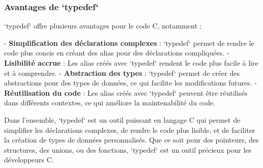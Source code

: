 \subsubsection*{Avantages de `typedef`}

`typedef` offre plusieurs avantages pour le code C, notamment :

- \textbf{Simplification des déclarations complexes} : `typedef` permet de rendre le code plus concis en créant des alias pour des déclarations compliquées.
- \textbf{Lisibilité accrue} : Les alias créés avec `typedef` rendent le code plus facile à lire et à comprendre.
- \textbf{Abstraction des types} : `typedef` permet de créer des abstractions pour des types de données, ce qui facilite les modifications futures.
- \textbf{Réutilisation du code} : Les alias créés avec `typedef` peuvent être réutilisés dans différents contextes, ce qui améliore la maintenabilité du code.

Dans l'ensemble, `typedef` est un outil puissant en langage C qui permet de simplifier les déclarations complexes, de rendre le code plus lisible, et de faciliter la création de types de données personnalisés. Que ce soit pour des pointeurs, des structures, des unions, ou des fonctions, `typedef` est un outil précieux pour les développeurs C.



